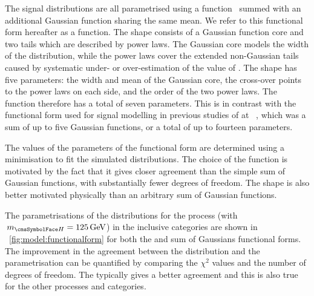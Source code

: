 The signal \mgg distributions are all parametrised using a \DCB function~\cite{CrystalBallFunction} summed with an additional Gaussian function sharing the same mean. We refer to this functional form hereafter as a \DCBpG function. %
The \DCB shape consists of a Gaussian function core and two tails which are described by power laws. The Gaussian core models the width of the distribution, while the power laws cover the extended non-Gaussian tails caused by systematic under- or over-estimation of the value of \mgg. %
The \DCB shape has five parameters: the width and mean of the Gaussian core, the cross-over points to the power laws on each side, and the order of the two power laws. The \DCBpG function therefore has a total of seven parameters. This is in contrast with the functional form used for signal modelling in previous studies of \Hgg at \CMS~\cite{LegacyHgg,CMS-PAS-HIG-15-005,CMS-PAS-HIG-16-020}, which was a sum of up to five Gaussian functions, or a total of up to fourteen parameters.

The values of the parameters of the functional form are determined using a \NLL minimisation to fit the simulated \mgg distributions.
The choice of the \DCBpG function is motivated by the fact that it gives closer agreement than the simple sum of Gaussian functions, with substantially fewer degrees of freedom. The \DCB shape is also better motivated physically than an arbitrary sum of Gaussian functions. 

The parametrisations of the \mgg distributions for the \ggH process (with $\mH=125\GeV$) in the inclusive categories are shown in \Fig~\ref{fig:model:functionalform} for both the \DCBpG and sum of Gaussians functional forms. The improvement in the agreement between the distribution and the parametrisation can be quantified by comparing the $\chi^2$ values and the number of degrees of freedom. The \DCBpG typically gives a better agreement and this is also true for the other processes and categories.

